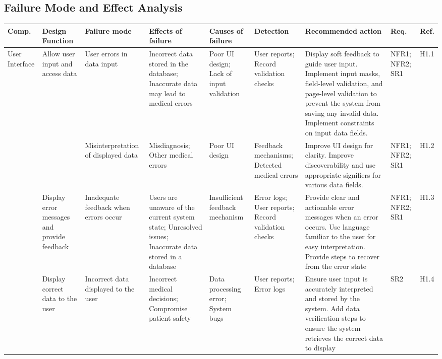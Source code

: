 \documentclass{article}
\begin{document}
\begin{landscape} 

    \section{Failure Mode and Effect Analysis}
    
    \begin{longtable}{|p{1.5cm}|p{2cm}|p{2.6cm}|p{2cm}|p{2cm}|p{2cm}|p{3.5cm}|p{1cm}|p{0.8cm}|}
        \toprule
        \textbf{Comp.} & \textbf{Design Function} & \textbf{Failure mode} & \textbf{Effects of failure} & \textbf{Causes of failure} & \textbf{Detection} & \textbf{Recommended action} & \textbf{Req.} & \textbf{Ref.}\\ 
        \midrule
        User Interface & \raggedright Allow user input and access data & \raggedright User errors in data input & \raggedright Incorrect data stored in the database; Inaccurate data may lead to medical errors & \raggedright Poor UI design; Lack of input validation & \raggedright User reports; Record validation checks & \raggedright Display soft feedback to guide user input. Implement input masks, field-level validation, and page-level validation to prevent the system from saving any invalid data. Implement constraints on input data fields. & NFR1; NFR2; SR1 & H1.1 \\ 
        \midrule
        & & \raggedright Misinterpretation of displayed data & \raggedright Misdiagnosis; Other medical errors & \raggedright Poor UI design & \raggedright Feedback mechanisms; Detected medical errors & \raggedright Improve UI design for clarity. Improve discoverability and use appropriate signifiers for various data fields. & NFR1; NFR2; SR1 & H1.2 \\ 
        \midrule
        & \raggedright Display error messages and provide feedback & \raggedright Inadequate feedback when errors occur & \raggedright Users are unaware of the current system state; Unresolved issues; Inaccurate data stored in a database & \raggedright Insufficient feedback mechanism & \raggedright Error logs; User reports; Record validation checks & \raggedright Provide clear and actionable error messages when an error occurs. Use language familiar to the user for easy interpretation. Provide steps to recover from the error state & NFR1; NFR2; SR1 & H1.3 \\
        \midrule
        & \raggedright Display correct data to the user & \raggedright Incorrect data displayed to the user & \raggedright Incorrect medical decisions; Compromise patient safety & \raggedright Data processing error; System bugs & \raggedright User reports; Error logs & \raggedright Ensure user input is accurately interpreted and stored by the system. Add data verification steps to ensure the system retrieves the correct data to display & SR2 & H1.4 \\

\end{longtable}
\end{landscape}
\end{document}
